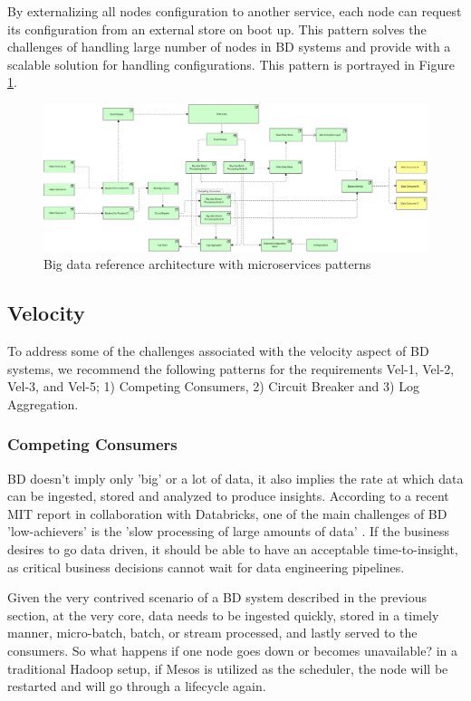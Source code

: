 \documentclass[a4paper,11pt,article,oneside]{memoir}
\begin{document}
By externalizing all nodes configuration to another service, each node can request its configuration from an external store on boot up. This pattern solves the challenges of handling large number of nodes in BD systems and provide with a scalable solution for handling configurations. This pattern is portrayed in Figure \ref{fig:RA}.

\begin{figure}[h]
    \centering 
    \includegraphics[width=16.5cm]{Media/All together.jpg}
    \caption{Big data reference architecture with microservices patterns}
    \label{fig:RA}
\end{figure}

\subsection{Velocity}

To address some of the challenges associated with the velocity aspect of BD systems, we recommend the following patterns for the requirements Vel-1, Vel-2, Vel-3, and Vel-5; 1) Competing Consumers, 2) Circuit Breaker and 3) Log Aggregation.

\subsubsection{Competing Consumers}

BD doesn't imply only 'big' or a lot of data, it also implies the rate at which data can be ingested, stored and analyzed to produce insights. According to a recent MIT report in collaboration with Databricks, one of the main challenges of BD 'low-achievers' is the 'slow processing of large amounts of data' \citep{DataBricksSurvey}. If the business desires to go data driven, it should be able to have an acceptable time-to-insight, as critical business decisions cannot wait for data engineering pipelines. 

Given the very contrived scenario of a BD system described in the previous section, at the very core, data needs to be ingested quickly, stored in a timely manner, micro-batch, batch, or stream processed, and lastly served to the consumers. So what happens if one node goes down or becomes unavailable? in a traditional Hadoop setup, if Mesos is utilized as the scheduler, the node will be restarted and will go through a lifecycle again. 
\end{document}
